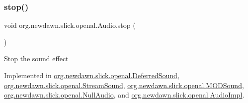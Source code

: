 \subsubsection{\texorpdfstring{stop()}{stop()}}
{\footnotesize\ttfamily void org.\+newdawn.\+slick.\+openal.\+Audio.\+stop (\begin{DoxyParamCaption}{ }\end{DoxyParamCaption})}

Stop the sound effect 

Implemented in \mbox{\hyperlink{classorg_1_1newdawn_1_1slick_1_1openal_1_1_deferred_sound_af5e0e80f3944f1cb3bba586f67b94337}{org.\+newdawn.\+slick.\+openal.\+Deferred\+Sound}}, \mbox{\hyperlink{classorg_1_1newdawn_1_1slick_1_1openal_1_1_stream_sound_a60b0a64ffdf99dfde3e3679323cbd647}{org.\+newdawn.\+slick.\+openal.\+Stream\+Sound}}, \mbox{\hyperlink{classorg_1_1newdawn_1_1slick_1_1openal_1_1_m_o_d_sound_ab8d293141044f71f49e65e730b215be7}{org.\+newdawn.\+slick.\+openal.\+M\+O\+D\+Sound}}, \mbox{\hyperlink{classorg_1_1newdawn_1_1slick_1_1openal_1_1_null_audio_a8c13b73a507be7786c06397c8b0175f0}{org.\+newdawn.\+slick.\+openal.\+Null\+Audio}}, and \mbox{\hyperlink{classorg_1_1newdawn_1_1slick_1_1openal_1_1_audio_impl_a8ad896e19c35a9d3d1d93e52685158ff}{org.\+newdawn.\+slick.\+openal.\+Audio\+Impl}}.


